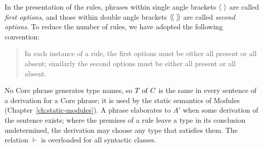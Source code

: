 In the presentation of the rules, phrases within single angle brackets
$\langle \ \rangle$ are called \emph{first options}, and those within double angle
brackets $\langle\!\langle \ \rangle\!\rangle$ are called \emph{second options}. To reduce the number of
rules, we have adopted the following convention:
\begin{quote}
In each instance of a rule, the first options must be either all present or all
absent; similarly the second options must be either all present or all absent.
\end{quote}

No Core phrase generates type names, so $T \mathrel{\mathrm{of}} C$ is the same in every sentence
of a derivation for a Core phrase; it is used by the static semantics of
Modules (Chapter~\ref{ch:static-modules}). A phrase elaborates to $A'$ when some
derivation of the sentence exists; where the premises of a rule leave a type in
its conclusion undetermined, the derivation may choose any type that satisfies
them. The relation $\vdash$ is overloaded for all syntactic classes.











